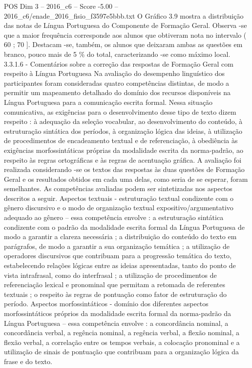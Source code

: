 \begin{textsample}{POS Dim 3 – 2016\_c6 – Score -5.00 – 2016\_c6/enade\_2016\_fisio\_f3597e5bbb.txt}
O Gráfico 3.9 mostra a distribuição das notas de Língua Portuguesa do Componente de Formação Geral.
Observa -se que a maior frequência corresponde aos alunos que obtiveram nota no intervalo ( 60 ; 70 ].
Destacam -se, também, os alunos que deixaram ambas as questões em branco, pouco mais de 5 \% do total, caracterizando -se como máximo local. 3.3.1.6 - Comentários sobre a correção das respostas de Formação Geral com respeito à Língua Portuguesa Na avaliação do desempenho linguístico dos participantes foram consideradas quatro competências distintas, de modo a permitir um mapeamento detalhado do domínio dos recursos disponíveis na Língua Portuguesa para a comunicação escrita formal.
Nessa situação comunicativa, as exigências para o desenvolvimento desse tipo de texto dizem respeito : à adequação da seleção vocabular, ao desenvolvimento do conteúdo, à estruturação sintática dos períodos, à organização lógica das ideias, à utilização de procedimentos de encadeamento textual e de referenciação, à obediência às exigências morfossintáticas próprias da modalidade escrita da norma-padrão, ao respeito às regras ortográficas e às regras de acentuação gráfica.
A avaliação foi realizada considerando -se os textos das respostas às duas questões de Formação Geral e os resultados obtidos em cada uma delas, como seria de se esperar, foram semelhantes.
As competências avaliadas podem ser sintetizadas nos aspectos descritos a seguir.
Aspectos textuais - estruturação textual condizente com o gênero discursivo e o modo de organização textual expositivo/argumentativo adequado ao gênero – essa competência envolve : a estruturação sintática condizente com o padrão da modalidade escrita formal da Língua Portuguesa de modo a garantir a clareza necessária ; a distribuição do conteúdo do texto em parágrafos, de modo a garantir a sua organização temática ; a utilização de operadores discursivos que contribuam para a progressão temática do texto, estabelecendo relações lógicas entre as ideias apresentadas, tanto do ponto de vista intrafrasal, como do interfrasal ; a utilização de procedimentos de referenciação lexical e pronominal que permitam a retomada de referentes textuais ; o respeito às regras de pontuação como fator de estruturação do período.
Aspectos morfossintáticos - domínio dos diferentes aspectos morfossintáticos próprios da modalidade escrita formal da norma-padrão da Língua Portuguesa – essa competência envolve : a concordância nominal, a concordância verbal, a regência nominal, a regência verbal, a flexão nominal, a flexão verbal, a correlação entre os tempos verbais, a colocação pronominal e a utilização de sinais de pontuação que contribuam para a organização lógica da frase e do texto.

\end{textsample}
